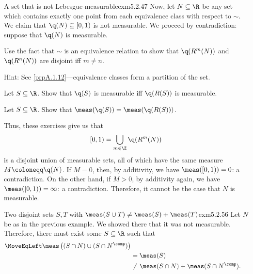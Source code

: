 \begin{exm}{A set that is not Lebesgue-measurable}{exm5.2.47}
Now, let $N\subseteq \R$ be any set which contains exactly one point from each equivalence class with respect to $\sim$.  We claim that $\q (N)\subseteq [0,1)$ is not measurable.  We proceed by contradiction:  suppose that $\q (N)$ is measurable.
\begin{exr}[breakable=false]{}{}
Use the fact that $\sim$ is an equivalence relation to show that $\q (R^m(N))$ and $\q (R^n(N))$ are disjoint iff $m\neq n$.
\begin{rmk}
Hint:  See \cref{prpA.1.12}---equivalence classes form a partition of the set.
\end{rmk}
\end{exr}
\begin{exr}[breakable=false]{}{}
Show that
\begin{equation}
[0,1)=\bigcup _{m\in \Z}\q (R^m(N))
\end{equation}
\begin{rmk}
Hint:  Once again, uses the fact that equivalence classes form a partition.
\end{rmk}
\end{exr}
\begin{exr}[breakable=false]{}{}
Let $S\subseteq \R$.  Show that $\q (S)$ is measurable iff $\q (R(S))$ is measurable.
\end{exr}
\begin{exr}[breakable=false]{}{}
Let $S\subseteq \R$.  Show that $\meas (\q (S))=\meas (\q (R(S)))$.
\end{exr}
Thus, these exercises give us that
\begin{equation}
[0,1)=\bigcup _{m\in \Z}\q (R^m(N))
\end{equation}
is a disjoint union of measurable sets, all of which have the same measure $M\coloneqq \q (N)$.  If $M=0$, then, by additivity, we have $\meas ([0,1))=0$:  a contradiction.  On the other hand, if $M>0$, by additivity again, we have $\meas ([0,1))=\infty$:  a contradiction.  Therefore, it cannot be the case that $N$ is measurable.
\end{exm}
\begin{exm}{Two disjoint sets $S,T$ with $\meas (S\cup T)\neq \meas (S)+\meas (T)$}{exm5.2.56}
Let $N$ be as in the previous example.  We showed there that it was not measurable.  Therefore, there must exist some $S\subseteq \R$ such that
\begin{equation}
\begin{split}
\MoveEqLeft
\meas \left( (S\cap N)\cup (S\cap N^{\comp})\right) \\
& =\meas (S) \\
& \neq \meas (S\cap N)+\meas (S\cap N^{\comp}).
\end{split}
\end{equation}
\end{exm}
